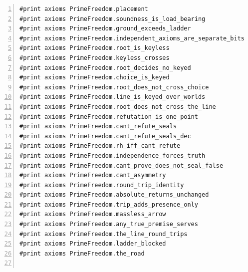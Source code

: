 \documentclass[10pt]{article}
\newcommand{\leansize}{\fontsize{5.5pt}{6.75pt}\selectfont}
\begin{document}
\begin{multicols}{2}
\begin{Verbatim}[numbers=left,firstnumber=1,numbersep=3pt,xleftmargin=2.6em,breaklines=true,breakanywhere=true,breakautoindent=false,breakindent=1.4em,breaksymbolleft={},breakanywheresymbolpre={},fontsize=\leansize]
#print axioms PrimeFreedom.placement
#print axioms PrimeFreedom.soundness_is_load_bearing
#print axioms PrimeFreedom.ground_exceeds_ladder
#print axioms PrimeFreedom.independent_axioms_are_separate_bits
#print axioms PrimeFreedom.root_is_keyless
#print axioms PrimeFreedom.keyless_crosses
#print axioms PrimeFreedom.root_decides_no_keyed
#print axioms PrimeFreedom.choice_is_keyed
#print axioms PrimeFreedom.root_does_not_cross_choice
#print axioms PrimeFreedom.line_is_keyed_over_worlds
#print axioms PrimeFreedom.root_does_not_cross_the_line
#print axioms PrimeFreedom.refutation_is_one_point
#print axioms PrimeFreedom.cant_refute_seals
#print axioms PrimeFreedom.cant_refute_seals_dec
#print axioms PrimeFreedom.rh_iff_cant_refute
#print axioms PrimeFreedom.independence_forces_truth
#print axioms PrimeFreedom.cant_prove_does_not_seal_false
#print axioms PrimeFreedom.cant_asymmetry
#print axioms PrimeFreedom.round_trip_identity
#print axioms PrimeFreedom.absolute_returns_unchanged
#print axioms PrimeFreedom.trip_adds_presence_only
#print axioms PrimeFreedom.massless_arrow
#print axioms PrimeFreedom.any_true_premise_serves
#print axioms PrimeFreedom.the_line_round_trips
#print axioms PrimeFreedom.ladder_blocked
#print axioms PrimeFreedom.the_road


\end{Verbatim}
\end{multicols}
\end{document}

